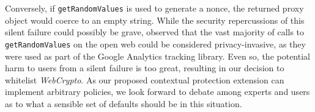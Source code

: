 Conversely, if \texttt{getRandomValues} is used to generate a nonce,  the
returned proxy object would coerce to an empty string. While the security
repercussions of this silent failure could possibly be grave,
\cite{snyder2016browser} observed that the vast majority of calls to
\texttt{getRandomValues} on the open web could be considered privacy-invasive,
as they were used as part of the Google Analytics tracking library. Even so,
the potential harm to users from a silent failure is too great, resulting in
our decision to whitelist \emph{WebCrypto}. As our proposed contextual
protection extension can implement arbitrary policies, we look forward to
debate among experts and users as to what a sensible set of defaults should be
in this situation.


